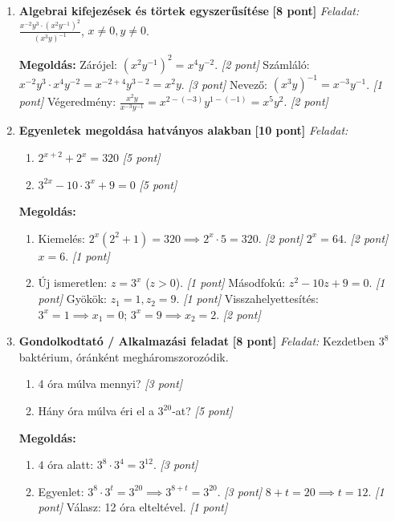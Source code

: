 \documentclass[a4paper,11pt]{article}
\begin{document}
\begin{enumerate}
  \item \textbf{Algebrai kifejezések és törtek egyszerűsítése} \hfill \textbf{[8 pont]}
  \textit{Feladat:} $\frac{x^{-2} y^3 \cdot (x^2 y^{-1})^2}{(x^3 y)^{-1}}$, $x \neq 0, y \neq 0$.

  \textbf{Megoldás:}
  Zárójel: $(x^2 y^{-1})^2 = x^4 y^{-2}$. \hfill \textit{[2 pont]}
  Számláló: $x^{-2} y^3 \cdot x^4 y^{-2} = x^{-2+4} y^{3-2} = x^2 y$. \hfill \textit{[3 pont]}
  Nevező: $(x^3 y)^{-1} = x^{-3} y^{-1}$. \hfill \textit{[1 pont]}
  Végeredmény: $\frac{x^2 y}{x^{-3} y^{-1}} = x^{2-(-3)} y^{1-(-1)} = x^5 y^2$. \hfill \textit{[2 pont]}

  \item \textbf{Egyenletek megoldása hatványos alakban} \hfill \textbf{[10 pont]}
  \textit{Feladat:} 
  \begin{enumerate}
    \item $2^{x+2} + 2^x = 320$ \hfill \textit{[5 pont]}
    \item $3^{2x} - 10 \cdot 3^x + 9 = 0$ \hfill \textit{[5 pont]}
  \end{enumerate}

  \textbf{Megoldás:}
  \begin{enumerate}
    \item Kiemelés: $2^x(2^2 + 1) = 320 \implies 2^x \cdot 5 = 320$. \hfill \textit{[2 pont]}
    $2^x = 64$. \hfill \textit{[2 pont]}
    $x = 6$. \hfill \textit{[1 pont]}
    \item Új ismeretlen: $z = 3^x$ ($z > 0$). \hfill \textit{[1 pont]}
    Másodfokú: $z^2 - 10z + 9 = 0$. \hfill \textit{[1 pont]}
    Gyökök: $z_1 = 1, z_2 = 9$. \hfill \textit{[1 pont]}
    Visszahelyettesítés: $3^x = 1 \implies x_1 = 0$; $3^x = 9 \implies x_2 = 2$. \hfill \textit{[2 pont]}
  \end{enumerate}

  \item \textbf{Gondolkodtató / Alkalmazási feladat} \hfill \textbf{[8 pont]}
  \textit{Feladat:} Kezdetben $3^8$ baktérium, óránként megháromszorozódik.
  \begin{enumerate}
    \item 4 óra múlva mennyi? \hfill \textit{[3 pont]}
    \item Hány óra múlva éri el a $3^{20}$-at? \hfill \textit{[5 pont]}
  \end{enumerate}

  \textbf{Megoldás:}
  \begin{enumerate}
    \item $4$ óra alatt: $3^8 \cdot 3^4 = 3^{12}$. \hfill \textit{[3 pont]}
    \item Egyenlet: $3^8 \cdot 3^t = 3^{20} \implies 3^{8+t} = 3^{20}$. \hfill \textit{[3 pont]}
    $8 + t = 20 \implies t = 12$. \hfill \textit{[1 pont]}
    Válasz: 12 óra elteltével. \hfill \textit{[1 pont]}
  \end{enumerate}
\end{enumerate}
\end{document}
